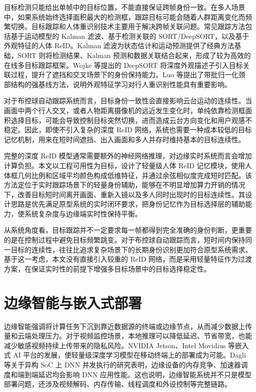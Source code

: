 目标检测只能给出单帧中的目标位置，不能直接保证跨帧身份一致。在多人场景中，如果系统始终选择面积最大的检测框，跟踪目标可能会随着人群距离变化而频繁切换。目标跟踪和人体重识别技术主要用于解决跨帧关联问题。常见跟踪方法包括基于运动模型的 Kalman 滤波、基于检测关联的 SORT/DeepSORT，以及基于外观特征的人体 ReID。Kalman 滤波为状态估计和运动预测提供了经典方法基础\cite{kalman_filter_1960}，SORT 则将检测结果、Kalman 预测和数据关联结合起来，形成了较为高效的在线多目标跟踪框架\cite{bewley_sort_2016}。Wojke 等提出的 DeepSORT 将深度外观描述子引入目标关联过程，提升了遮挡和交叉场景下的身份保持能力\cite{wojke_deepsort_2017}。Luo 等提出了带批归一化颈部结构的强基线方法，说明外观特征学习对行人重识别性能具有重要影响\cite{luo_reid_baseline_2020}。

对于布控球自动跟踪系统而言，目标身份一致性会直接影响云台运动的连续性。当画面中两个行人交叉，或者人物距离摄像机的远近发生变化时，单纯依靠检测框面积选择目标，可能会导致控制目标突然切换，进而造成云台方向变化和用户观感不稳定。因此，即使不引入复杂的深度 ReID 网络，系统也需要一种成本较低的目标记忆机制，用来在短时间遮挡、出入画面和多人并存时维持基本的目标连续性。

完整的深度 ReID 模型通常需要额外的神经网络推理，对边缘实时系统而言会增加计算负担。本文以工程可用性为目标，设计了轻量级人体 ReID 记忆模块，使用人体框几何比例和区域平均颜色构成低维特征，并通过余弦相似度完成短时匹配。该方法定位于实时跟踪场景下的轻量身份辅助，能够在不明显增加算力开销的情况下，改善目标短时间离开画面、重新入镜以及多人同时出现时的目标连续性。其设计思路是优先满足原型系统的实时闭环要求，把身份记忆作为目标选择层的辅助能力，使系统复杂度与边缘端实时性保持平衡。

从系统角度看，目标跟踪并不一定要求每一帧都得到完全准确的身份判断，更重要的是在控制过程中避免目标频繁跳变。对于布控球自动跟踪而言，短时间内保持同一目标的连续性，往往比追求复杂场景下的长期身份识别更加符合原型系统需求。基于这一考虑，本文没有直接引入较重的 ReID 网络，而是采用轻量特征作为过渡方案，在保证实时性的前提下增强多目标场景中的目标选择稳定性。

\section{边缘智能与嵌入式部署}

边缘智能强调将计算任务下沉到靠近数据源的终端或边缘节点，从而减少数据上传量和云端处理压力。对于视频监控场景，本地推理可以降低延迟、节省带宽，也能减少敏感视频持续上传带来的隐私风险。NVIDIA Jetson、Intel Movidius 等嵌入式 AI 平台的发展，使轻量级深度学习模型在移动终端上的部署成为可能。Dagli 等关于异构 SoC 上 DNN 并发执行的研究表明，边缘设备的内存竞争、加速器调度和端到端延迟均会影响 DNN 应用性能\cite{dagli_shared_memory_2024}。这也说明，边缘智能系统并不只是模型部署问题，还涉及视频解码、内存传输、线程调度和外设控制等完整链路。

